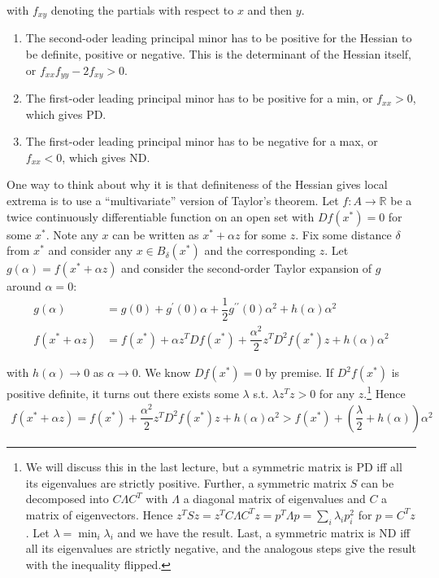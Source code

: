 \documentclass{article}
\begin{document}
with $f_{xy}$ denoting the partials with respect to $x$ and then $y$.
\begin{enumerate}
  \item The second-oder leading principal minor has to be positive for the Hessian to be definite, positive or negative. This is the determinant of the Hessian itself, or $f_{xx} f_{yy} - 2 f_{xy} > 0$.

  \item The first-oder leading principal minor has to be positive for a min, or $f_{xx} > 0$, which gives PD.

  \item The first-oder leading principal minor has to be negative for a max, or $f_{xx} < 0$, which gives ND.
\end{enumerate}

\begin{remark}
  One way to think about why it is that definiteness of the Hessian gives local extrema is to use a ``multivariate'' version of Taylor's theorem. Let $f: A \to \mathbb{R}$ be a twice continuously differentiable function on an open set with $Df(x^*) = 0$ for some $x^*$. Note any $x$ can be written as $x^* + \alpha z$ for some $z$. Fix some distance $\delta$ from $x^*$ and consider any $x \in B_{\delta}(x^*)$ and the corresponding $z$. Let $g(\alpha) = f(x^* + \alpha z)$ and consider the second-order Taylor expansion of $g$ around $\alpha = 0$:
  \begin{align*}
    g(\alpha)
    &
    =
    g(0)
    +
    g^\prime(0) \alpha
    +
    \dfrac{1}{2} g^{\prime\prime}(0) \alpha^2
    +
    h(\alpha) \alpha^2
    \\
    f(x^* + \alpha z)
    &
    =
    f(x^*)
    +
    \alpha z^T Df(x^*)
    +
    \dfrac{\alpha^2}{2}
    z^T D^2f(x^*) z
    +
    h(\alpha) \alpha^2
  \end{align*}

  with $h(\alpha) \to 0$ as $\alpha \to 0$. We know $Df(x^*) = 0$ by premise. If $D^2f(x^*)$ is positive definite, it turns out there exists some $\lambda$ s.t. $\lambda z^T z > 0$ for any $z$.\footnote{We will discuss this in the last lecture, but a symmetric matrix is PD iff all its eigenvalues are strictly positive. Further, a symmetric matrix $S$ can be decomposed into $C \Lambda C^T$ with $\Lambda$ a diagonal matrix of eigenvalues and $C$ a matrix of eigenvectors. Hence $z^T S z = z^T C \Lambda C^T z = p^T \Lambda p = \sum_{i} \lambda_i p_i^2$ for $p = C^T z$. Let $\lambda = \min_i \lambda_i$ and we have the result. Last, a symmetric matrix is ND iff all its eigenvalues are strictly negative, and the analogous steps give the result with the inequality flipped.} Hence
  \begin{align*}
    f(x^* + \alpha z)
    =
    f(x^*)
    +
    \dfrac{\alpha^2}{2}
    z^T D^2f(x^*) z
    +
    h(\alpha) \alpha^2
    >
    f(x^*)
    +
    \left(
      \dfrac{\lambda}{2} + h(\alpha)
    \right) \alpha^2
  \end{align*}


\end{remark}
\end{document}
